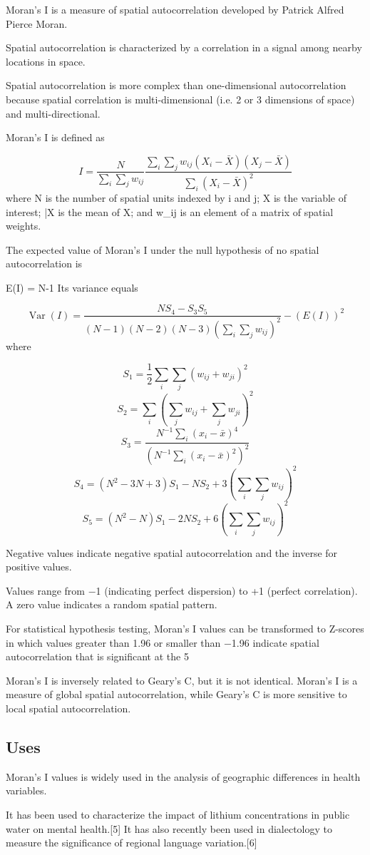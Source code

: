 Moran's I is a measure of spatial autocorrelation developed by Patrick Alfred Pierce Moran.

Spatial autocorrelation is characterized by a correlation in a signal among nearby locations in space. 

Spatial autocorrelation is more complex than one-dimensional autocorrelation because spatial correlation is multi-dimensional (i.e. 2 or 3 dimensions of space) and multi-directional.

Moran's I is defined as

\[ I = \frac{N} {\sum_{i} \sum_{j} w_{ij}} \frac {\sum_{i} \sum_{j} w_{ij}(X_i-\bar X) (X_j-\bar X)} {\sum_{i} (X_i-\bar X)^2}  \]
where N is the number of spatial units indexed by i and j; X is the variable of interest; \bar X is the mean of X; and w_{ij} is an element of a matrix of spatial weights.

The expected value of Moran's I under the null hypothesis of no spatial autocorrelation is

 E(I) =  {N-1} 
Its variance equals

\[ \operatorname{Var}(I) = \frac{NS_4-S_3S_5} {(N-1)(N-2)(N-3)(\sum_{i} \sum_{j} w_{ij})^2} - (E(I))^2 \]
where

 \[ S_1 = \frac {1} {2} \sum_{i} \sum_{j} (w_{ij}+w_{ji})^2   \]
 \[ S_2 = \sum_{i} ( \sum_{j} w_{ij} + \sum_{j} w_{ji})^2 \]
 \[ S_3 = \frac {N^{-1} \sum_{i} (x_i - \bar x)^4} {(N^{-1} \sum_{i} (x_i - \bar x)^2)^2}  \]
 \[ S_4 = (N^2-3N+3)S_1 - NS_2 + 3 (\sum_{i} \sum_{j} w_{ij})^2 \]
 \[ S_5 = (N^2-N) S_1 - 2NS_2 + 6(\sum_{i} \sum_{j} w_{ij})^2 \]

Negative values indicate negative spatial autocorrelation and the inverse for positive values. 

Values range from −1 (indicating perfect dispersion) to +1 (perfect correlation). A zero value indicates a random spatial pattern. 

For statistical hypothesis testing, Moran's I values can be transformed to Z-scores in which values greater than 1.96 or smaller than −1.96 indicate spatial autocorrelation that is significant at the 5%

Moran's I is inversely related to Geary's C, but it is not identical. Moran's I is a measure of global spatial autocorrelation, while Geary's C is more sensitive to local spatial autocorrelation.
\subsection{Uses}
Moran's I values is widely used in the analysis of geographic differences in health variables. 

It has been used to characterize the impact of lithium concentrations in public water on mental health.[5] It has also recently been used in dialectology to measure the significance of regional language variation.[6]
